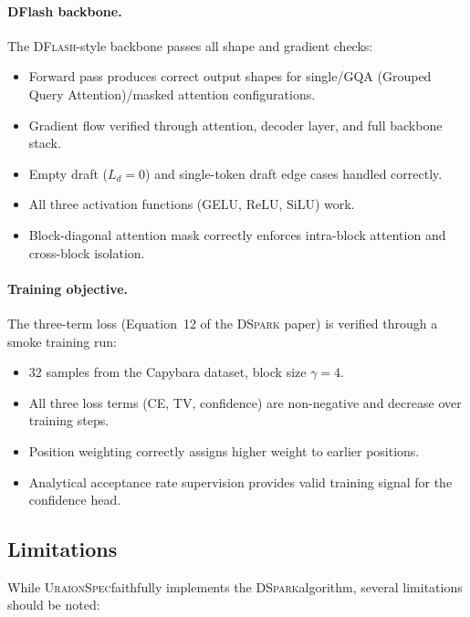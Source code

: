 \documentclass[11pt,a4paper]{article}
\newcommand{\UraionSpec}{\textsc{UraionSpec}}
\newcommand{\DSpark}{\textsc{DSpark}}
\newcommand{\DFlash}{\textsc{DFlash}}
\begin{document}
\paragraph{DFlash backbone.}
The \DFlash-style backbone passes all shape and gradient checks:
\begin{itemize}
  \item Forward pass produces correct output shapes for single/GQA (Grouped Query Attention)/masked
    attention configurations.
  \item Gradient flow verified through attention, decoder layer, and full
    backbone stack.
  \item Empty draft ($L_d=0$) and single-token draft edge cases handled correctly.
  \item All three activation functions (GELU, ReLU, SiLU) work.
  \item Block-diagonal attention mask correctly enforces intra-block
    attention and cross-block isolation.
\end{itemize}

\paragraph{Training objective.}
The three-term loss (Equation~12 of the \DSpark{} paper) is verified through a smoke training run:
\begin{itemize}
  \item 32 samples from the Capybara dataset, block size $\gamma=4$.
  \item All three loss terms (CE, TV, confidence) are non-negative and
    decrease over training steps.
  \item Position weighting correctly assigns higher weight to earlier
    positions.
  \item Analytical acceptance rate supervision provides valid training
    signal for the confidence head.
\end{itemize}

\subsection{Limitations}
\label{subsec:limitations}

While \UraionSpec faithfully implements the \DSpark algorithm, several
limitations should be noted:
\end{document}
